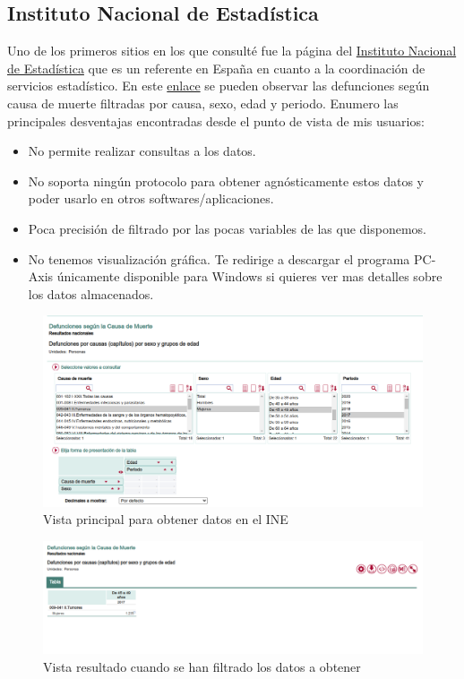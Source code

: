 \subsection{Instituto Nacional de Estadística}
Uno de los primeros sitios en los que consulté fue la página del
\href{https://www.ine.es/index.htm}{Instituto Nacional de Estadística} que es un referente
en España en cuanto a la coordinación de servicios estadístico. En este
\href{https://www.ine.es/jaxiT3/Tabla.htm?t=6609}{enlace} se pueden observar las
defunciones según causa de muerte filtradas por causa, sexo, edad y periodo. Enumero las
principales desventajas encontradas desde el punto de vista de mis usuarios:
\begin{itemize}
    \item No permite realizar consultas a los datos.
    \item No soporta ningún protocolo para obtener agnósticamente estos datos y poder
    usarlo en otros softwares/aplicaciones.
    \item Poca precisión de filtrado por las pocas variables de las que disponemos.
    \item No tenemos visualización gráfica. Te redirige a descargar el programa PC-Axis
    únicamente disponible para Windows si quieres ver mas detalles sobre los datos
    almacenados.
\end{itemize}
\FloatBarrier
\begin{figure}[]
	\centering
	\includegraphics[scale=0.5]{doc/logos/imgs/ine1.png}
	\caption{  Vista principal para obtener datos en el INE }
    \label{fig:worst_f_value}
\end{figure}

\begin{figure}[]
	\centering
	\includegraphics[scale=0.5]{doc/logos/imgs/ine2.png}
	\caption{ Vista resultado cuando se han filtrado los datos a obtener }
    \label{fig:worst_f_value}
\end{figure}
\FloatBarrier

